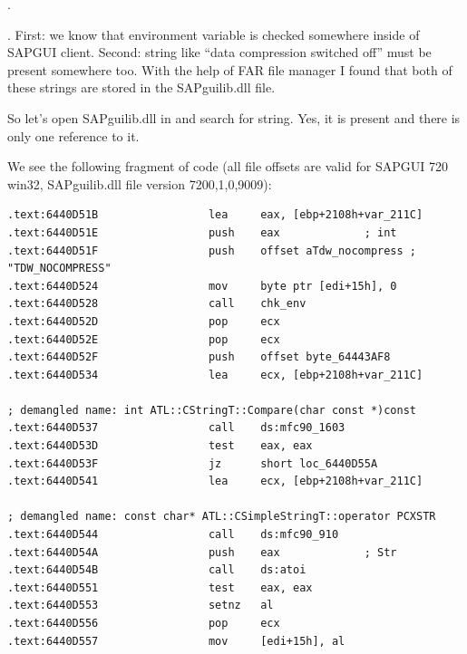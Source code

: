 .

.
{First: we know that environment variable \IT{\TDWNC} is checked somewhere inside of SAPGUI client.}
{Second: string like ``data compression switched off'' must be present somewhere too.}
{With the help of FAR file manager I found that both of these strings are stored in the SAPguilib.dll file.}

{So let's open SAPguilib.dll in \IDA and search for  string. 
Yes, it is present and there is only one reference to it.}

{We see the following fragment of code 
(all file offsets are valid for SAPGUI 720 win32, SAPguilib.dll file version 7200,1,0,9009)}:

\begin{lstlisting}
.text:6440D51B                 lea     eax, [ebp+2108h+var_211C]
.text:6440D51E                 push    eax             ; int
.text:6440D51F                 push    offset aTdw_nocompress ; "TDW_NOCOMPRESS"
.text:6440D524                 mov     byte ptr [edi+15h], 0
.text:6440D528                 call    chk_env
.text:6440D52D                 pop     ecx
.text:6440D52E                 pop     ecx
.text:6440D52F                 push    offset byte_64443AF8
.text:6440D534                 lea     ecx, [ebp+2108h+var_211C]

; demangled name: int ATL::CStringT::Compare(char const *)const
.text:6440D537                 call    ds:mfc90_1603
.text:6440D53D                 test    eax, eax
.text:6440D53F                 jz      short loc_6440D55A
.text:6440D541                 lea     ecx, [ebp+2108h+var_211C]

; demangled name: const char* ATL::CSimpleStringT::operator PCXSTR 
.text:6440D544                 call    ds:mfc90_910
.text:6440D54A                 push    eax             ; Str
.text:6440D54B                 call    ds:atoi
.text:6440D551                 test    eax, eax
.text:6440D553                 setnz   al
.text:6440D556                 pop     ecx
.text:6440D557                 mov     [edi+15h], al
\end{lstlisting}

